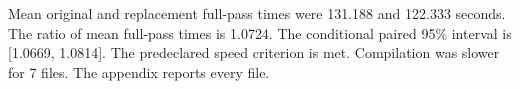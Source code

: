 Mean original and replacement full-pass times were 131.188 and 122.333 seconds. The ratio of mean full-pass times is 1.0724. The conditional paired 95\% interval is [1.0669, 1.0814]. The predeclared speed criterion is met. Compilation was slower for 7 files. The appendix reports every file.
